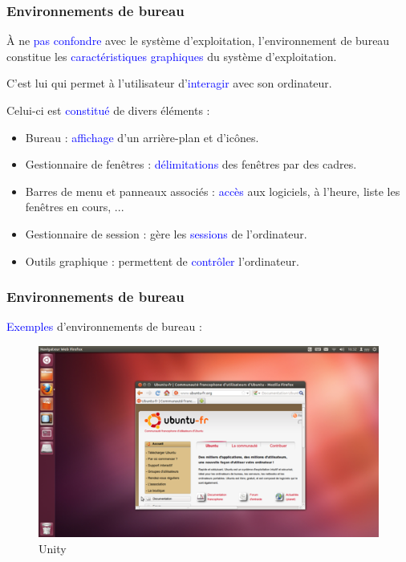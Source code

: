 \documentclass[aspectratio=169]{beamer}
\begin{document}
\begin{frame}
\frametitle{Environnements de bureau}
À ne \textcolor{blue}{pas confondre} avec le système d'exploitation,
l'environnement de bureau constitue les \textcolor{blue}{caractéristiques
graphiques} du système d'exploitation.

\hspace{0.5cm}

C'est lui qui permet à l'utilisateur d'\textcolor{blue}{interagir}
avec son ordinateur.

\hspace{0.5cm}

Celui-ci est \textcolor{blue}{constitué} de divers éléments :

\begin{itemize}
\item Bureau : \textcolor{blue}{affichage} d'un arrière-plan et d'icônes.

\item Gestionnaire de fenêtres : \textcolor{blue}{délimitations} des fenêtres
par des cadres.

\item Barres de menu et panneaux associés : \textcolor{blue}{accès} aux logiciels,
à l'heure, liste les fenêtres en cours, ...

\item Gestionnaire de session : gère les \textcolor{blue}{sessions} de
l'ordinateur.

\item Outils graphique : permettent de \textcolor{blue}{contrôler}
l'ordinateur.
\end{itemize}
\end{frame}

\begin{frame}
  \frametitle{Environnements de bureau}
  \textcolor{blue}{Exemples} d'environnements de bureau :

  \begin{figure}[!h]
    \center
    \includegraphics[scale=0.23]
    {textures/images/unix/desktop_environment/unity.png}
    \caption{Unity}
  \end{figure}
\end{frame}
\end{document}
